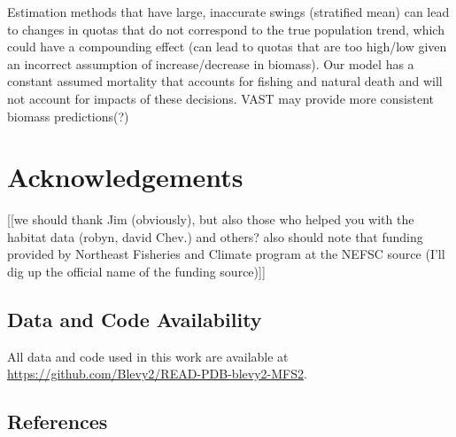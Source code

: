 \documentclass[
  12pt,
]{article}
\begin{document}
Estimation methods that have large, inaccurate swings (stratified mean) can lead to changes in quotas that do not correspond to the true population trend, which could have a compounding effect (can lead to quotas that are too high/low given an incorrect assumption of increase/decrease in biomass). Our model has a constant assumed mortality that accounts for fishing and natural death and will not account for impacts of these decisions. VAST may provide more consistent biomass predictions(?)

\section{Acknowledgements}

{[}{[}we should thank Jim (obviously), but also those who helped you with the habitat data (robyn, david Chev.) and others? also should note that funding provided by Northeast Fisheries and Climate program at the NEFSC source (I'll dig up the official name of the funding source){]}{]}

\hypertarget{data-and-code-availability}{%
\subsection{Data and Code Availability}\label{data-and-code-availability}}

All data and code used in this work are available at \url{https://github.com/Blevy2/READ-PDB-blevy2-MFS2}.

\hypertarget{references}{%
\subsection{References}\label{references}}
\end{document}
